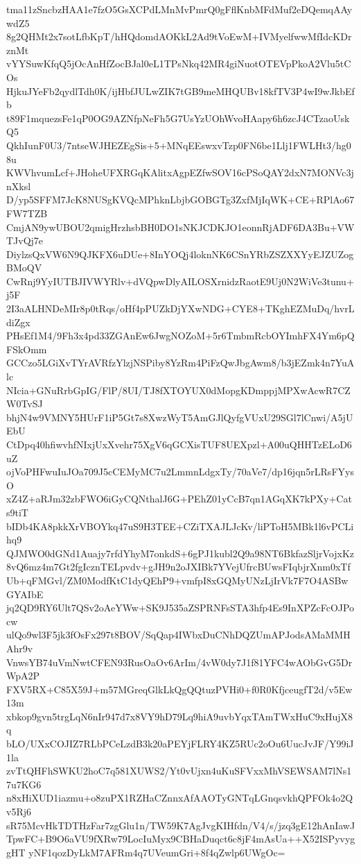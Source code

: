 tma11zSncbzHAA1e7fzO5GsXCPdLMnMvPmrQ0gFflKnbMFdMuf2eDQemqAAywdZ5
8g2QHMt2x7sotLfbKpT/hHQdomdAOKkL2Ad9tVoEwM+IVMyelfwwMfIdcKDrznMt
vYYSuwKfqQ5jOcAnHfZocBJal0eL1TPsNkq42MR4giNuotOTEVpPkoA2Vlu5tCOs
HjkuJYeFb2qydlTdh0K/ijHbfJULwZIK7tGB9meMHQUBv18kfTV3P4wI9wJkbEfb
t89F1mquezsFe1qP0OG9AZNfpNeFh5G7UsYzUOhWvoHAapy6h6zcJ4CTzaoUskQ5
QkhIunF0U3/7ntseWJHEZEgSis+5+MNqEEswxvTzp0FN6be1Llj1FWLHt3/hg08u
KWVhvumLcf+JHoheUFXRGqKAlitxAgpEZfwSOV16cPSoQAY2dxN7MONVc3jnXksl
D/yp5SFFM7JcK8NUSgKVQcMPhknLbjbGOBGTg3ZxfMjIqWK+CE+RPlAo67FW7TZB
CmjAN9ywUBOU2qmigHrzhsbBH0DO1sNKJCDKJO1eonnRjADF6DA3Bu+VWTJvQj7e
DiylzsQxVW6N9QJKFX6uDUe+8InYOQj4loknNK6CSnYRbZSZXXYyEJZUZogBMoQV
CwRnj9YyIUTBJIVWYRlv+dVQpwDlyAILOSXrnidzRaotE9Uj0N2WiVe3tunu+j5F
2I3aALHNDeMIr8p0tRqs/oHf4pPUZkDjYXwNDG+CYE8+TKghEZMuDq/hvrLdiZgx
PHsEf1M4/9Fh3x4pd33ZGAnEw6JwgNOZoM+5r6TmbmRcbOYImhFX4Ym6pQFSkOmm
GCCzo5LGiXvTYrAVRfzYlzjNSPiby8YzRm4PiFzQwJbgAwm8/b3jEZmk4n7YuAlc
NIcia+GNuRrbGpIG/FlP/8UI/TJ8fXTOYUX0dMopgKDmppjMPXwAcwR7CZW0TvSJ
bhjN4w9VMNY5HUrF1iP5Gt7s8XwzWyT5AmGJlQyfgVUxU29SGl7lCnwi/A5jUEbU
CtDpq40hfiwvhfNIxjUxXvehr75XgV6qGCXisTUF8UEXpzl+A00uQHHTzELoD6uZ
ojVoPHFwuIuJOa709J5cCEMyMC7u2LmmnLdgxTy/70aVe7/dp16jqn5rLRsFYysO
xZ4Z+aRJm32zbFWO6iGyCQNthalJ6G+PEhZ01yCcB7qn1AGqXK7kPXy+Cats9tiT
bIDb4KA8pkkXrVBOYkq47uS9H3TEE+CZiTXAJLJcKv/liPToH5MBk1l6vPCLihq9
QJMWO0dGNd1Auajy7rfdYhyM7onkdS+6gPJ1kubl2Q9a98NT6BkfazSljrVojxKz
8vQ6mz4m7Gt2fgIcznTELpvdv+gJH9n2oJXIBk7YVejUfrcBUwsFIqbjrXnm0xTf
Ub+qFMGvl/ZM0ModfKtC1dyQEhP9+vmfpI8xGQMyUNzLjIrVk7F7O4ASBwGYAIbE
jq2QD9RY6Ult7QSv2oAeYWw+SK9J535aZSPRNFsSTA3hfp4Es9InXPZcFcOJPocw
ulQo9wl3F5jk3fOsFx297t8BOV/SqQap4IWbxDuCNhDQZUmAPJodsAMaMMHAhr9v
VnwsYB74uVmNwtCFEN93RusOaOv6ArIm/4vW0dy7J1f81YFC4wAObGvG5DrWpA2P
FXV5RX+C85X59J+m57MGreqGlkLkQgQQtuzPVHi0+f0R0KfjceugfT2d/v5Ew13m
xbkop9gvn5trgLqN6nIr947d7x8VY9hD79Lq9hiA9uvbYqxTAmTWxHuC9xHujX8q
bLO/UXxCOJIZ7RLbPCeLzdB3k20aPEYjFLRY4KZ5RUc2oOu6UucJvJF/Y99iJ1la
zvTtQHFhSWKU2hoC7q581XUWS2/Yt0vUjxn4uKuSFVxxMhVSEWSAM7lNs17u7KG6
n8xHiXUD1iazmu+o8zuPX1RZHaCZnnxAfAAOTyGNTqLGnqsvkhQPFOk4o2Qv5Rj6
sR75McvHkTDTHzFar7zgGlu1n/TW59K7AgJvgKIHfdn/V4/s/jzq3gE12hAnIawJ
TpwFC+B9O6aVU9fXRw79LocIuMyx9CBHaDuqct6c8jF4mAsUa++X52ISPyvyggHT
yNF1qozDyLkM7AFRm4q7UVeumGri+8f4qZwlp6UWgOc=

